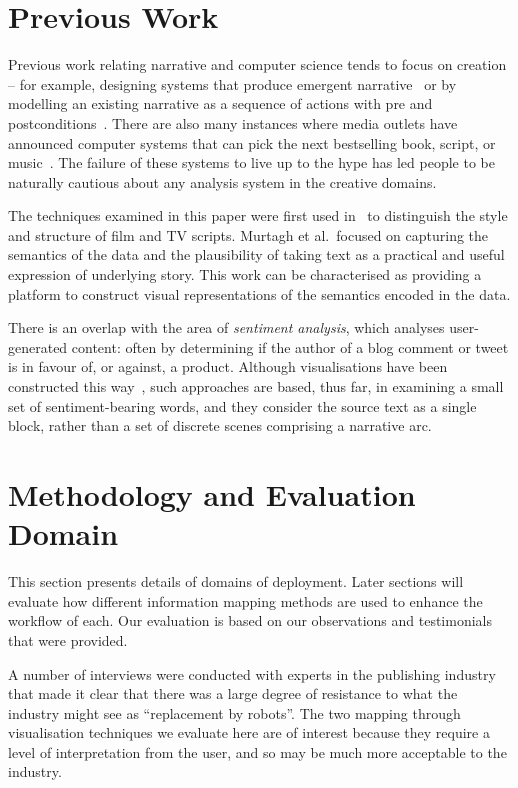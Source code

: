 \documentclass{article}
\begin{document}
\section{Previous Work}
\label{related}

Previous work relating narrative and computer science tends to focus on creation -- for example, designing systems that produce emergent narrative~\cite{callaway2002narrative,kriegel2008emergent,louchart2008purposeful} or by modelling an existing narrative as a sequence of actions with pre and postconditions~\cite{Porteous:2010}.   There are also many instances where media outlets have announced computer systems that can pick the next bestselling book, script, or music~\cite{nextbigthing}. The failure of these systems to live up to the hype has led people to be naturally cautious about any analysis system in the creative domains. 

The techniques examined in this paper were first used in~\cite{Murtagh2009302,Murtagh2010253} to distinguish the style and structure of film and TV scripts.  Murtagh et al.\ focused on capturing the semantics of the data and the plausibility of taking text as a practical and useful expression of underlying story. This work can be characterised as providing a platform to construct visual representations of the semantics encoded in the data. 

There is an overlap with the area of {\em sentiment analysis}, which analyses user-generated content: often by determining if the author of a  blog comment or tweet is in favour of, or against, a product.  Although visualisations have been constructed this way~\cite{Chen_abstractvisual,gamon2005pulse,kakkonen-galickakkonen:2011:DigHum}, such approaches are based, thus far, in examining a small set of sentiment-bearing words, and they consider the source text as a single block, rather than a set of discrete scenes comprising a narrative arc. 


\section{Methodology and Evaluation Domain} 
This section presents details of domains of deployment.  Later sections will evaluate how different information mapping methods are used to enhance the workflow of each. Our evaluation is based on our observations and testimonials that were provided. 

A number of interviews were conducted with experts in the publishing industry that made it clear that there was a large degree of resistance to what the industry might see as ``replacement by robots''. The two mapping through visualisation techniques we evaluate here are of interest because they require a level of interpretation from the user, and so may be much more acceptable to the industry.
\end{document}
